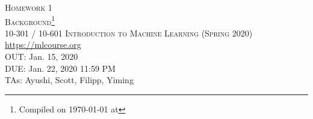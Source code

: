 \documentclass[11pt,addpoints,answers]{exam}
\title{\textsc{\hwName}} %
\author{}
\date{}
\date{}
\numberwithin{equation}{section} %
\numberwithin{figure}{section} %
\numberwithin{table}{section} %
\newcommand{\courseNum}{10-301 / 10-601}
\newcommand{\courseName}{Introduction to Machine Learning}
\newcommand{\courseSem}{Spring 2020}
\newcommand{\courseUrl}{\url{https://mlcourse.org}}
\newcommand{\hwNum}{Homework 1}
\newcommand{\hwTopic}{Background}
\newcommand{\outDate}{Jan. 15, 2020}
\newcommand{\dueDate}{Jan. 22, 2020 11:59 PM}
\newcommand{\taNames}{Ayushi, Scott, Filipp, Yiming}
\begin{document}
\section*{}
\begin{center}
  \textsc{\LARGE \hwNum} \\
  \textsc{\LARGE \hwTopic\footnote{Compiled on \today{} at \currenttime{}}} \\
  \vspace{1em}
  \textsc{\large \courseNum{} \courseName{} (\courseSem)} \\
  \courseUrl\\
  \vspace{1em}
  OUT: \outDate \\
  DUE: \dueDate \\
  TAs: \taNames
\end{center}
\end{document}

